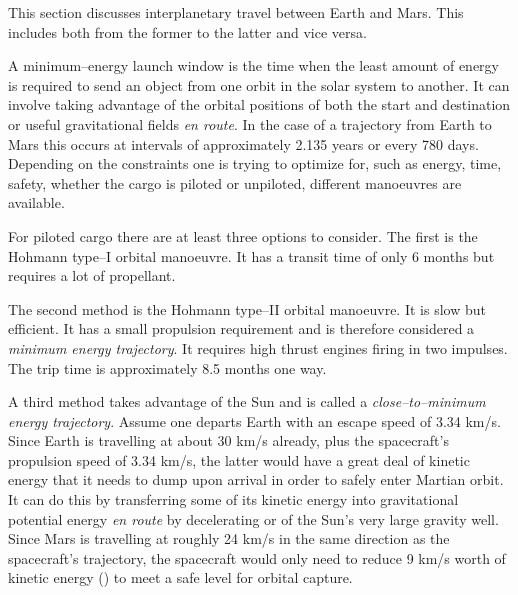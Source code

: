 

This section discusses interplanetary travel between Earth and Mars. This includes both from the former to the latter and vice versa.

A minimum--energy launch window is the time when the least amount of energy is required to send an object from one orbit in the solar system to another. It can involve taking advantage of the orbital positions of both the start and destination or useful gravitational fields {\it en route}. In the case of a trajectory from Earth to Mars this occurs at intervals of approximately 2.135 years or every 780 days. Depending on the constraints one is trying to optimize for, such as energy, time, safety, whether the cargo is piloted or unpiloted, different manoeuvres are available.

For piloted cargo there are at least three options to consider. The first is the Hohmann type--I orbital manoeuvre. It has a transit time of only 6 months but requires a lot of propellant.

The second method is the Hohmann type--II orbital manoeuvre. It is slow but efficient. It has a small propulsion requirement and is therefore considered a {\it minimum energy trajectory}. It requires high thrust engines firing in two impulses. The trip time is approximately 8.5 months one way.

A third method takes advantage of the Sun and is called a {\it close--to--minimum energy trajectory}. Assume one departs Earth with an escape speed of 3.34 km/s. Since Earth is travelling at about 30 km/s already, plus the spacecraft's propulsion speed of 3.34 km/s, the latter would have a great deal of kinetic energy that it needs to dump upon arrival in order to safely enter Martian orbit. It can do this by transferring some of its kinetic energy into gravitational potential energy {\it en route} by decelerating or  of the Sun's very large gravity well. Since Mars is travelling at roughly 24 km/s in the same direction as the spacecraft's trajectory, the spacecraft would only need to reduce 9 km/s worth of kinetic energy () to meet a safe level for orbital capture.

